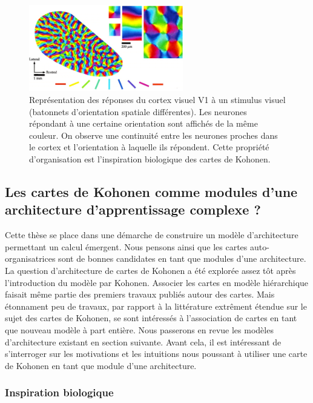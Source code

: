\documentclass[../main]{subfiles}
\begin{document}
\begin{figure}
\centering
\includegraphics[width=0.6\textwidth]{v1.jpg}
\caption{Représentation des réponses du cortex visuel V1 à un stimulus visuel (batonnets d'orientation spatiale différentes). Les neurones répondant à une certaine orientation sont affichés de la même couleur. On observe une continuité entre les neurones proches dans le cortex et l'orientation à laquelle ils répondent. Cette propriété d'organisation est l'inspiration biologique des cartes de Kohonen. }
\label{fig:v1}
\end{figure}

\subsection{Les cartes de Kohonen comme modules d'une architecture d'apprentissage complexe ? }

Cette thèse se place dans une démarche de construire un modèle d'architecture permettant un calcul émergent. Nous pensons ainsi que les cartes auto-organisatrices sont de bonnes candidates en tant que modules d'une architecture.
La question d'architecture de cartes de Kohonen a été explorée assez tôt après l'introduction du modèle par Kohonen.
Associer les cartes en modèle hiérarchique faisait même partie des premiers travaux publiés autour des cartes.
Mais étonnament peu de travaux, par rapport à la littérature extrêment étendue sur le sujet des cartes de Kohonen, se sont intéressés à l'association de cartes en tant que nouveau modèle à part entière. Nous passerons en revue les modèles d'architecture existant en section suivante. Avant cela, il est intéressant de s'interroger sur les motivations et les intuitions nous poussant à utiliser une carte de Kohonen en tant que module d'une architecture.

\subsubsection{Inspiration biologique}
\end{document}
